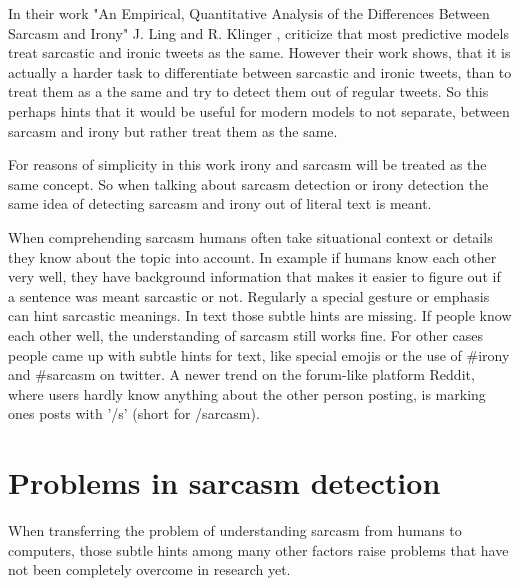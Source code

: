 \documentclass[sigconf,  review=false, nonacm=true]{acmart}
\begin{document}
In their work "An Empirical, Quantitative Analysis of the Differences Between Sarcasm and Irony" J. Ling and R. Klinger \cite{diff_irony_sarcasm}, criticize that most predictive models treat sarcastic and ironic tweets as the same. However their work shows, that it is actually a harder task to differentiate between sarcastic and ironic tweets, than to treat them as a the same and try to detect them out of regular tweets. So this perhaps hints that it would be useful for modern models to not separate, between sarcasm and irony but rather treat them as the same. 

For reasons of simplicity in this work irony and sarcasm will be treated as the same concept. So when talking about sarcasm detection or irony detection the same idea of detecting sarcasm and irony out of literal text is meant.

When comprehending sarcasm humans often take situational context or details they know about the topic into account. In example if humans know each other very well, they have background information that makes it easier to figure out if a sentence was meant sarcastic or not. Regularly a special gesture or emphasis can hint sarcastic meanings. In text those subtle hints are missing. If people know each other well, the understanding of sarcasm still works fine. For other cases people came up with subtle hints for text, like special emojis or the use of \#irony and \#sarcasm on twitter.  A newer trend on the forum-like platform Reddit, where users hardly know anything about the other person posting, is marking ones posts with '/s' (short for /sarcasm). 


\section{Problems in sarcasm detection}

When transferring the problem of understanding sarcasm from humans to computers, those subtle hints among many other factors raise problems that have not been completely overcome in research yet. 
\end{document}
